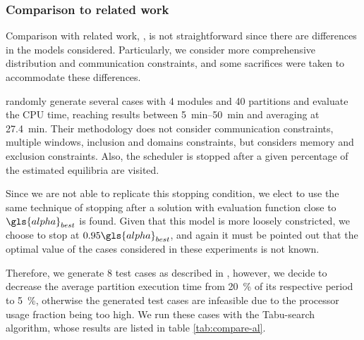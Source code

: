 \documentclass[main.tex]{subfiles}
\begin{document}

\subsubsection{Comparison to related work}

Comparison with related work, \cite{al2012strictly, pira2016line}, is not straightforward since there are differences in the models considered.
Particularly, we consider more comprehensive distribution and communication constraints, and some sacrifices were taken to accommodate these differences.

\Textcite{al2012strictly} randomly generate several cases with 4 modules and 40 partitions and evaluate the CPU time, reaching results between \SIrange{5}{50}{\minute} and averaging at \SI{27.4}{\minute}.
Their methodology does not consider communication constraints, multiple windows, inclusion and domains constraints, but considers memory and exclusion constraints.
Also, the scheduler is stopped after a given percentage of the estimated equilibria are visited.

Since we are not able to replicate this stopping condition, we elect to use the same technique of stopping after a solution with evaluation function close to $\gls{alpha}_{best}$ is found.
Given that this model is more loosely constricted, we choose to stop at $0.95\gls{alpha}_{best}$, and again it must be pointed out that the optimal value of the cases considered in these experiments is not known.

Therefore, we generate \num{8} test cases as described in \textcite{al2012strictly}, however, we decide to decrease the average partition execution time from \SI{20}{\percent} of its respective period to \SI{5}{\percent}, otherwise the generated test cases are infeasible due to the processor usage fraction being too high.
We run these cases with the Tabu-search algorithm, whose results are listed in table \ref{tab:compare-al}.
\end{document}
